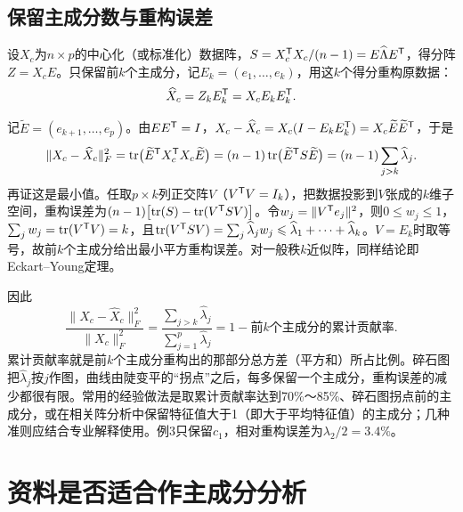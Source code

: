 \subsection{保留主成分数与重构误差}
设$X_c$为$n\times p$的中心化（或标准化）数据阵，$S=X_c^{\mathsf T} X_c/(n-1)=E\widehat\Lambda E^{\mathsf T}$，得分阵$Z=X_cE$。只保留前$k$个主成分，记$E_k=(e_1,\ldots,e_k)$，用这$k$个得分重构原数据：
\[
\widehat X_c=Z_kE_k^{\mathsf T}=X_cE_kE_k^{\mathsf T}.
\]
\begin{zm}
记$\widetilde E=(e_{k+1},\ldots,e_p)$。由$EE^{\mathsf T}=I$，$X_c-\widehat X_c=X_c(I-E_kE_k^{\mathsf T})=X_c\widetilde E\widetilde E^{\mathsf T}$，于是
\[
\|X_c-\widehat X_c\|_F^2=\operatorname{tr}\bigl(\widetilde E^{\mathsf T} X_c^{\mathsf T} X_c\widetilde E\bigr)=(n-1)\operatorname{tr}\bigl(\widetilde E^{\mathsf T} S\widetilde E\bigr)=(n-1)\sum_{j>k}\widehat\lambda_j.
\]
再证这是最小值。任取$p\times k$列正交阵$V$（$V^{\mathsf T} V=I_k$），把数据投影到$V$张成的$k$维子空间，重构误差为$(n-1)\bigl[\operatorname{tr}(S)-\operatorname{tr}(V^{\mathsf T} SV)\bigr]$。令$w_j=\|V^{\mathsf T} e_j\|^2$，则$0\leqslant w_j\leqslant1$，$\sum_jw_j=\operatorname{tr}(V^{\mathsf T} V)=k$，且$\operatorname{tr}(V^{\mathsf T} SV)=\sum_j\widehat\lambda_jw_j\leqslant\widehat\lambda_1+\cdots+\widehat\lambda_k$。$V=E_k$时取等号，故前$k$个主成分给出最小平方重构误差。对一般秩$k$近似阵，同样结论即Eckart--Young定理。
\end{zm}
因此
\[
\frac{\|X_c-\widehat X_c\|_F^2}{\|X_c\|_F^2}=\frac{\sum_{j>k}\widehat\lambda_j}{\sum_{j=1}^p\widehat\lambda_j}=1-\text{前$k$个主成分的累计贡献率}.
\]
累计贡献率就是前$k$个主成分重构出的那部分总方差（平方和）所占比例。碎石图把$\widehat\lambda_j$按$j$作图，曲线由陡变平的“拐点”之后，每多保留一个主成分，重构误差的减少都很有限。常用的经验做法是取累计贡献率达到70\%～85\%、碎石图拐点前的主成分，或在相关阵分析中保留特征值大于1（即大于平均特征值）的主成分；几种准则应结合专业解释使用。例3只保留$c_1$，相对重构误差为$\lambda_2/2=3.4\%$。
\section{资料是否适合作主成分分析}
